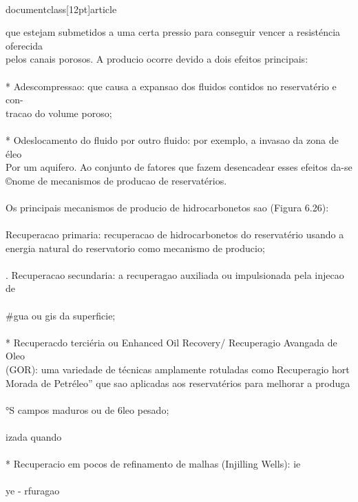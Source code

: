 \\documentclass[12pt]{article}
\begin{document}
que estejam submetidos a uma certa pressio para conseguir vencer a resisténcia oferecida\\
pelos canais porosos. A producio ocorre devido a dois efeitos principais:\\
\\
* Adescompressao: que causa a expansao dos fluidos contidos no reservatério e con-\\
tracao do volume poroso;\\
\\
* Odeslocamento do fluido por outro fluido: por exemplo, a invasao da zona de éleo\\
Por um aquifero. Ao conjunto de fatores que fazem desencadear esses efeitos da-se\\
©nome de mecanismos de producao de reservatérios.\\
\\
Os principais mecanismos de producio de hidrocarbonetos sao (Figura 6.26):\\
\\
Recuperacao primaria: recuperacao de hidrocarbonetos do reservatério usando a\\
energia natural do reservatorio como mecanismo de producio;\\
\\
. Recuperacao secundaria: a recuperagao auxiliada ou impulsionada pela injecao de\\
\\#gua ou gis da superficie;\\
\\
* Recuperacdo terciéria ou Enhanced Oil Recovery/ Recuperagio Avangada de Oleo\\
(GOR): uma variedade de técnicas amplamente rotuladas como Recuperagio hort\\
Morada de Petréleo” que sao aplicadas aos reservatérios para melhorar a produga\\
\\
°S campos maduros ou de 6leo pesado;\\
\\
izada quando\\
\\
* Recuperacio em pocos de refinamento de malhas (Injilling Wells): ie\\
\\
ye - rfuragao\\
\end{document}
